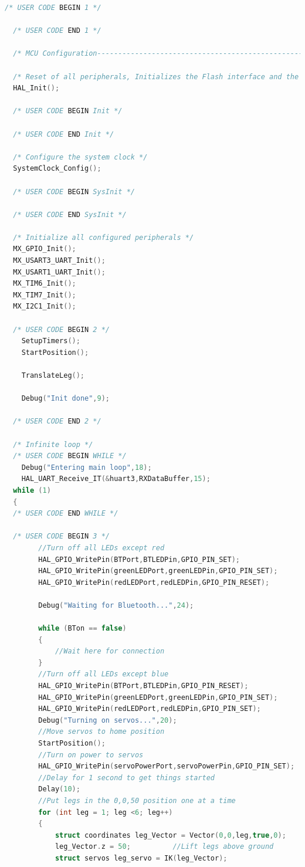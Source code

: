 \begin{lstlisting}[language = c]
  /* USER CODE BEGIN 1 */

  /* USER CODE END 1 */

  /* MCU Configuration----------------------------------------------------------*/

  /* Reset of all peripherals, Initializes the Flash interface and the Systick. */
  HAL_Init();

  /* USER CODE BEGIN Init */

  /* USER CODE END Init */

  /* Configure the system clock */
  SystemClock_Config();

  /* USER CODE BEGIN SysInit */

  /* USER CODE END SysInit */

  /* Initialize all configured peripherals */
  MX_GPIO_Init();
  MX_USART3_UART_Init();
  MX_USART1_UART_Init();
  MX_TIM6_Init();
  MX_TIM7_Init();
  MX_I2C1_Init();

  /* USER CODE BEGIN 2 */
	SetupTimers();
	StartPosition();

	TranslateLeg();

	Debug("Init done",9);

  /* USER CODE END 2 */

  /* Infinite loop */
  /* USER CODE BEGIN WHILE */
	Debug("Entering main loop",18);
	HAL_UART_Receive_IT(&huart3,RXDataBuffer,15);											//Receive commands via bluetooth in interrupt mode
  while (1)
  {
  /* USER CODE END WHILE */

  /* USER CODE BEGIN 3 */
		//Turn off all LEDs except red
		HAL_GPIO_WritePin(BTPort,BTLEDPin,GPIO_PIN_SET);
		HAL_GPIO_WritePin(greenLEDPort,greenLEDPin,GPIO_PIN_SET);
		HAL_GPIO_WritePin(redLEDPort,redLEDPin,GPIO_PIN_RESET);
		
		Debug("Waiting for Bluetooth...",24);
		
		while (BTon == false)
		{
			//Wait here for connection
		}
		//Turn off all LEDs except blue
		HAL_GPIO_WritePin(BTPort,BTLEDPin,GPIO_PIN_RESET);
		HAL_GPIO_WritePin(greenLEDPort,greenLEDPin,GPIO_PIN_SET);
		HAL_GPIO_WritePin(redLEDPort,redLEDPin,GPIO_PIN_SET);
		Debug("Turning on servos...",20);
		//Move servos to home position
		StartPosition();
		//Turn on power to servos
		HAL_GPIO_WritePin(servoPowerPort,servoPowerPin,GPIO_PIN_SET);
		//Delay for 1 second to get things started
		Delay(10);
		//Put legs in the 0,0,50 position one at a time
		for (int leg = 1; leg <6; leg++)
		{
			struct coordinates leg_Vector = Vector(0,0,leg,true,0);
			leg_Vector.z = 50;			//Lift legs above ground
			struct servos leg_servo = IK(leg_Vector);
			

\end{lstlisting}
